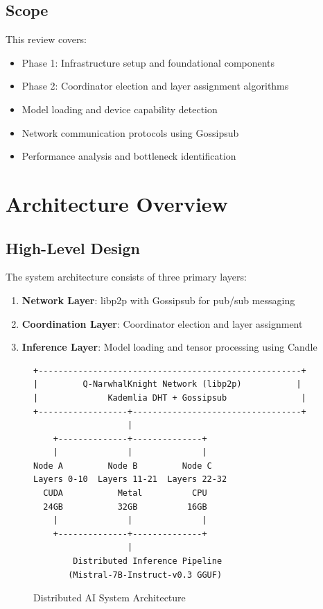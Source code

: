 \documentclass[12pt,a4paper]{article}
\begin{document}
\subsection{Scope}
This review covers:
\begin{itemize}
    \item Phase 1: Infrastructure setup and foundational components
    \item Phase 2: Coordinator election and layer assignment algorithms
    \item Model loading and device capability detection
    \item Network communication protocols using Gossipsub
    \item Performance analysis and bottleneck identification
\end{itemize}

\section{Architecture Overview}

\subsection{High-Level Design}

The system architecture consists of three primary layers:

\begin{enumerate}
    \item \textbf{Network Layer}: libp2p with Gossipsub for pub/sub messaging
    \item \textbf{Coordination Layer}: Coordinator election and layer assignment
    \item \textbf{Inference Layer}: Model loading and tensor processing using Candle
\end{enumerate}

\begin{figure}[h]
\centering
\begin{verbatim}
+-----------------------------------------------------+
|         Q-NarwhalKnight Network (libp2p)           |
|              Kademlia DHT + Gossipsub               |
+------------------+----------------------------------+
                   |
    +--------------+--------------+
    |              |              |
Node A         Node B         Node C
Layers 0-10  Layers 11-21  Layers 22-32
  CUDA           Metal          CPU
  24GB           32GB          16GB
    |              |              |
    +--------------+--------------+
                   |
        Distributed Inference Pipeline
       (Mistral-7B-Instruct-v0.3 GGUF)
\end{verbatim}
\caption{Distributed AI System Architecture}
\end{figure}
\end{document}
